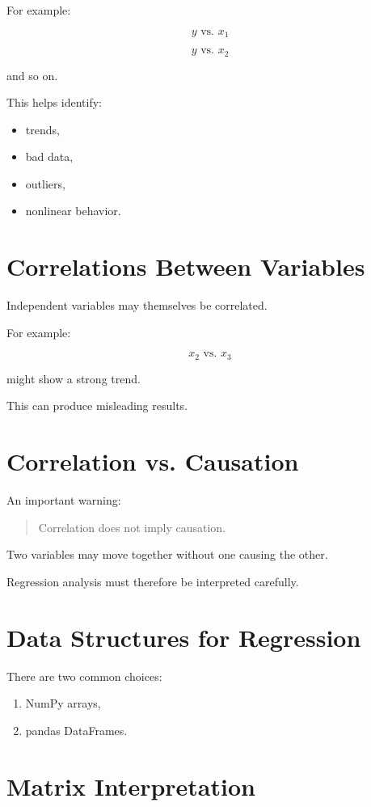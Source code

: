 \documentclass[11pt]{article}
\begin{document}
For example:

\[
y \text{ vs. } x_1
\]

\[
y \text{ vs. } x_2
\]

and so on.

This helps identify:

\begin{itemize}
    \item trends,
    \item bad data,
    \item outliers,
    \item nonlinear behavior.
\end{itemize}

\section{Correlations Between Variables}

Independent variables may themselves be correlated.

For example:

\[
x_2 \text{ vs. } x_3
\]

might show a strong trend.

This can produce misleading results.

\section{Correlation vs. Causation}

An important warning:

\begin{quote}
Correlation does not imply causation.
\end{quote}

Two variables may move together without one causing the other.

Regression analysis must therefore be interpreted carefully.

\section{Data Structures for Regression}

There are two common choices:

\begin{enumerate}
    \item NumPy arrays,
    \item pandas DataFrames.
\end{enumerate}

\section{Matrix Interpretation}
\end{document}
